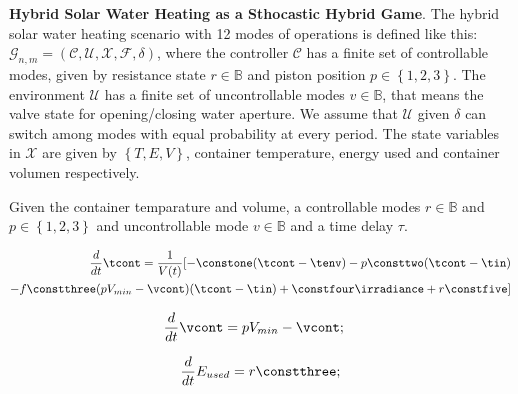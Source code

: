 
\newpage

\textbf{Hybrid Solar Water Heating as a Sthocastic Hybrid Game}.
The hybrid solar water heating scenario with 12 modes of operations is
defined  like this: $\mathcal{G}_{n,m} = (\mathcal{C,U,X,F},\delta)$, 
where the controller $\mathcal{C}$ has a finite set of controllable modes,
given by resistance state ${r \in \mathbb{B}}$ and piston position $p \in 
\left\lbrace1,2,3\right\rbrace $. The environment $\mathcal{U}$ has a finite  
set of uncontrollable modes $v \in \mathbb{B} $, that means the valve state 
for opening/closing water aperture. We assume that $\mathcal{U}$ given
$\delta$ can switch among modes with equal probability at every period. 
The state variables in $\mathcal{X}$ are given by $\left\lbrace
T,E,V \right\rbrace $, container temperature, energy used and container volumen
respectively.

Given the container temparature and volume, a controllable modes $r \in \mathbb{B}$
and $p \in \left\lbrace1,2,3\right\rbrace $ and uncontrollable mode
$v \in \mathbb{B} $ and a time delay $\tau$.


\begin{equation}
    \begin{aligned}
\frac{d}{dt}\tcont = \frac{1}{V(t)} [ -\constone(\tcont-\tenv)
- p \consttwo(\tcont-\tin) \\
- f \constthree(pV_{min} - \vcont)(\tcont-\tin)
+ \constfour\irradiance+ 
r \constfive ]
    \end{aligned}
\label{temperature-equation}    
\end{equation}

\begin{equation}
\frac{d}{dt}\vcont = pV_{min} - \vcont; \quad
\label{volume-equation}
\end{equation}

\begin{equation} 
\frac{d}{dt}E_{used} =  r \constthree ;
\label{Energy-equation}
\end{equation}


